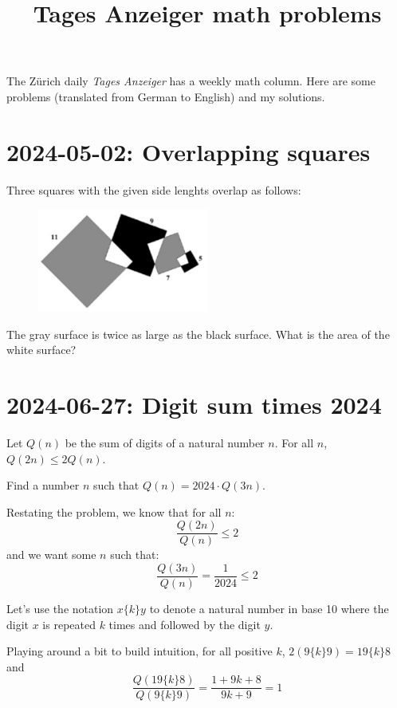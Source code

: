 \documentclass[11pt, oneside]{amsart}
\title{Tages Anzeiger math problems}
\begin{document}
\maketitle

The Zürich daily {\em Tages Anzeiger} has a weekly math column. Here are some
problems (translated from German to English) and my solutions.

\section{2024-05-02: Overlapping squares}

Three squares with the given side lenghts overlap as follows:

\begin{figure}[!h] 
    \centering
    \includegraphics[width=0.5\textwidth]{squares.png}
\end{figure}

The gray surface is twice as large as the black surface. What is the area of the white surface?



\section{2024-06-27: Digit sum times 2024}

Let $Q(n)$ be the sum of digits of a natural number $n$. For all $n$, $Q(2n) \leq 2Q(n)$.

Find a number $n$ such that $Q(n) = 2024 \cdot Q(3n)$.

\vspace{1em}

Restating the problem, we know that for all $n$:
\[ \frac{Q(2n)}{Q(n)} \leq 2 \]
and we want some $n$ such that:
\[ \frac{Q(3n)}{Q(n)} = \frac{1}{2024} \leq 2 \]

Let's use the notation $x\{k\}y$ to denote a natural number in base 10 where the digit $x$ is repeated $k$ times
and followed by the digit $y$.

Playing around a bit to build intuition, for all positive $k$, $2(9\{k\}9) = 19\{k\}8$ and
\[ \frac{Q(19\{k\}8)}{Q(9\{k\}9)} = \frac{1+9k+8}{9k+9} = 1\]
\end{document}
